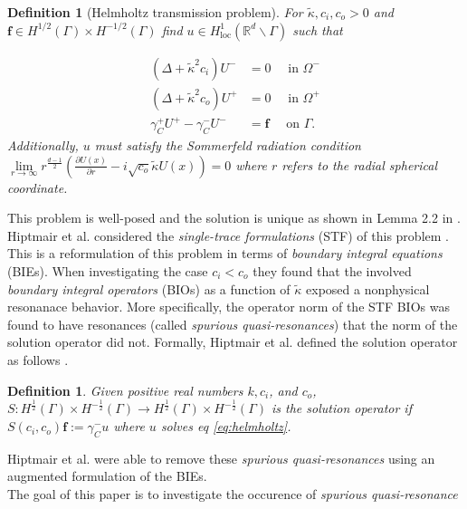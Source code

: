\documentclass[10pt,journal,compsoc, onecolumn]{IEEEtran}
\newtheorem{definition}[theorem]{Definition}
\begin{document}
\begin{definition}[Helmholtz transmission problem]
For $\tilde \kappa, c_i, c_o > 0$ and \(\mathbf{f} \in H^{1 / 2}(\Gamma) \times H^{-1 / 2}(\Gamma)\) find \(u \in H_{\operatorname{loc}}^{1}\left(\mathbb{R}^{d} \backslash \Gamma\right)\) 
such that

\begin{align}
    \left(\Delta+\tilde\kappa^{2} c_{i}\right) U^{-} &=0  \quad \text { in } \Omega^{-}  \nonumber \\
    \left(\Delta+\tilde\kappa^{2} c_{o}\right) U^{+} &=0  \quad \text { in } \Omega^{+} \label{eq:helmholtz} \\
    \gamma_{C}^{+} U^{+} - \gamma_{C}^{-} U^{-} &=\mathbf{f} \quad  \text { on } \Gamma. \nonumber 
\end{align}
Additionally, $u$ must satisfy the Sommerfeld radiation condition 
\(\lim\limits_{r \rightarrow \infty} r^{\frac{d-1}{2}}\left(\frac{\partial U(x)}{\partial r}-i \sqrt{c_o} \tilde \kappa U(x)\right)=0\) 
where $r$ refers to the radial spherical coordinate. 
\end{definition} 
This problem is well-posed and the solution is unique as shown in Lemma 2.2 in \cite{moiola2019acoustic}.\\
Hiptmair et al. considered the \textit{single-trace formulations} (STF) of this problem  \cite{hiptmair2021spurious}. 
This is a reformulation of this problem in terms of \textit{boundary integral equations} (BIEs). 
When investigating the case $c_i < c_o$ they found that the involved  \textit{boundary integral operators} (BIOs) as a
 function of $\tilde \kappa$ exposed a nonphysical resonanace behavior. 
More specifically, the operator norm of the STF BIOs was found to have resonances (called \textit{spurious quasi-resonances})
that the norm of the solution operator did not.
Formally, Hiptmair et al. defined the solution operator as follows \cite{hiptmair2021spurious}.
\begin{definition}
    Given positive real numbers \(k, c_{i}\), and \(c_{o}\), 
    $S: H^{\frac{1}{2}}(\Gamma) \times H^{-\frac{1}{2}}(\Gamma) \rightarrow  H^{\frac{1}{2}}(\Gamma) \times H^{-\frac{1}{2}}(\Gamma)$ is the solution operator if 
     \(S\left(c_{i}, c_{o}\right) \mathbf{f}:=\gamma_{C}^{-} u\)
    where \(u\) solves eq \ref{eq:helmholtz}.
\end{definition}
Hiptmair et al. were able to remove these \textit{spurious quasi-resonances} 
using an augmented formulation of the BIEs.  \\
The goal of this paper is to investigate the occurence of \textit{spurious quasi-resonance}
\end{document}
